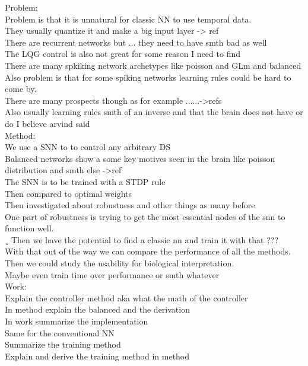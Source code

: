 Problem:\\
Problem is that it is unnatural for classic NN to use temporal data.\\
They usually quantize it and make a big input layer -> ref\\
There are recurrent networks but ... they need to have smth bad as well\\
The LQG control is also not great for some reason I need to find\\
There are many spkiking network archetypes like poisson and GLm and balanced\\
Also problem is that for some spiking networks learning rules could be hard to come by.\\
There are many prospects though as for example ......->refs\\
Also usually learning rules smth of an inverse and that the brain does not have or do I believe arvind said\\



Method:\\
We use a SNN to to control any arbitrary DS\\
Balanced networks show a some key motives seen in the brain like poisson distribution and smth else ->ref\\
The SNN is to be trained with a STDP rule\\
Then compared to optimal weights\\
Then investigated about robustness and other things as many before\\
One part of robustness is trying to get the most essential nodes of the snn to function well.\\¸
Then we have the potential to find a classic nn and train it with that ???\\
With that out of the way we can compare the performance of all the methods.\\
Then we could study the usability for biological interpretation.\\
Maybe even train time over performance or smth whatever\\


Work:\\
Explain the controller method aka what the math of the controller\\
In method explain the balanced and the derivation\\
In work summarize the implementation\\
Same for the conventional NN\\
Summarize the training method\\
Explain and derive the training method in method\\


